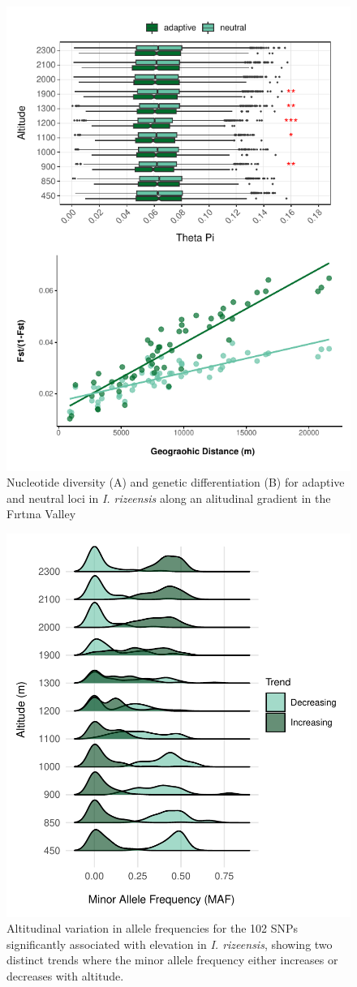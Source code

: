 \documentclass[9pt,a4paper,twoside]{rho-class/rho}
\begin{document}
\clearpage
\newpage
\begin{figure}[h!]
\centering
\includegraphics[width=0.8\columnwidth]{Figure_3.pdf}
\captionsetup[table]{labelsep=space, 
        justification=raggedright, singlelinecheck=off}
    \caption{Nucleotide diversity (A) and genetic differentiation (B) for adaptive and neutral loci in \textit{I. rizeensis} along an alitudinal gradient in the Fırtına Valley}
\label{Figure 3}
\end{figure}
\newpage
\begin{figure}[h!]
\centering
\includegraphics[width=0.8\columnwidth]{Figure_5.pdf}
\caption{Altitudinal variation in allele frequencies for the 102 SNPs significantly associated with elevation in \textit{I. rizeensis}, showing two distinct trends where the minor allele frequency either increases or decreases with altitude.}
\label{Figure 4}
\end{figure}
\end{document}
